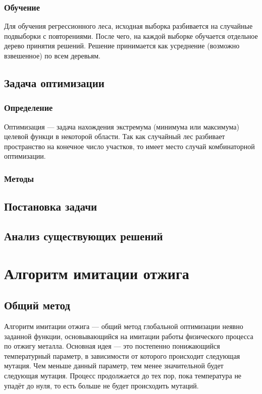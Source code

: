 \documentclass[pscyr,specification,annotation]{itmo-student-thesis}
\begin{document}
\subsection{Обучение}
Для обучения регрессионного леса, исходная выборка разбивается на случайные
подвыборки с повторениями. После чего, на каждой выборке обучается отдельное
дерево принятия решений. Решение принимается как усреднение (возможно
взвешенное) по всем деревьям.


\section{Задача оптимизации}
\subsection{Определение}
Оптимизация --- задача нахождения экстремума (минимума или максимума) целевой
функци в некоторой области. Так как случайный лес разбивает пространство на
конечное число участков, то имеет место случай комбинаторной оптимизации.

\subsection{Методы}

\section{Постановка задачи}

\section{Анализ существующих решений}

\chapter{Алгоритм имитации отжига}

\section{Общий метод}
Алгоритм имитации отжига --- общий метод глобальной оптимизации неявно заданной функции,
основывающийся на имитации работы физического процесса по отжигу металла.
Основная идея --- это постепенно понижающийся температурный параметр,
в зависимости от которого происходит следующая мутация. Чем меньше данный параметр,
тем менее значительной будет следующая мутация. Процесс продолжается до тех пор, пока
температура не упадёт до нуля, то есть больше не будет происходить мутаций.
\end{document}
